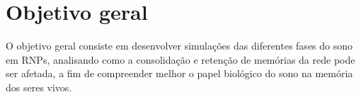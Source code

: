 \section{Objetivo geral}

O objetivo geral consiste em desenvolver simulações das diferentes fases do sono em RNPs, analisando como a consolidação e
retenção de memórias da rede pode ser afetada, a fim de compreender melhor o papel biológico do sono na memória dos seres vivos.
